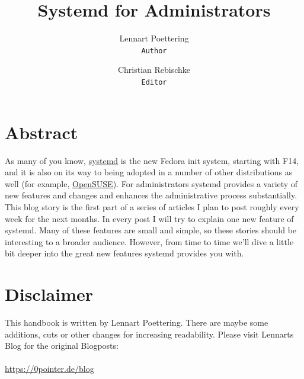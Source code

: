 \documentclass[titlepage]{article}
\title{Systemd for Administrators}
\author{
    Lennart Poettering\\
    \texttt{Author}
    \and
    Christian Rebischke\\
    \texttt{Editor}
}
\begin{document}
\maketitle
\tableofcontents
\newpage

\section{Abstract}
As many of you know,
\href{https://www.freedesktop.org/wiki/Software/systemd}{systemd} is the new
Fedora init system, starting with F14, and it is also on its way to being
adopted in a number of other distributions as well (for example,
\href{https://en.opensuse.org/SDB:Systemd}{OpenSUSE}). For administrators
systemd provides a variety of new features and changes and enhances the
administrative process substantially. This blog story is the first part of a
series of articles I plan to post roughly every week for the next months. In
every post I will try to explain one new feature of systemd. Many of these
features are small and simple, so these stories should be interesting to a
broader audience. However, from time to time we'll dive a little bit deeper
into the great new features systemd provides you with.  
\section{Disclaimer}
This handbook is written by Lennart Poettering. There are maybe some 
additions, cuts or other changes for increasing readability.
Please visit Lennarts Blog for the original Blogposts:
\\
\\
\url{https://0pointer.de/blog}
\newpage
\end{document}
